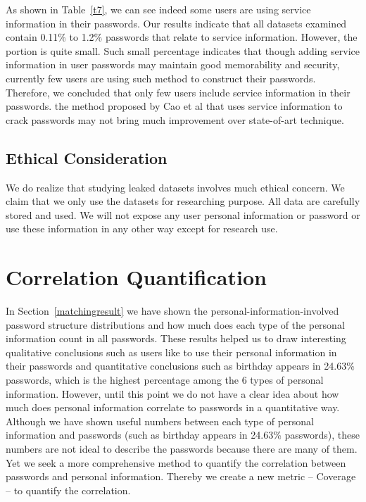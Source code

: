 \documentclass{sig-alternate}
\begin{document}
As shown in Table~\ref{t7}, we can see indeed some users are using service information in their passwords. Our results indicate that all datasets examined contain 0.11\% to 1.2\% passwords that relate to service information. However, the portion is quite small. Such small percentage indicates that though adding service information in user passwords may maintain good memorability and security, currently few users are using such method to construct their passwords. Therefore, we concluded that only few users include service information in their passwords. the method proposed by Cao et al that uses service information to crack passwords may not bring much improvement over state-of-art technique.


\subsection{Ethical Consideration}
We do realize that studying leaked datasets involves much ethical concern. We claim that we only use the datasets for researching purpose. All data are carefully stored and used. We will not expose any user personal information or password or use these information in any other way except for research use.

\section{Correlation Quantification}
\label{correlationquantification}
In Section~\ref{matchingresult} we have shown the personal-information-involved password structure distributions and how much does each type of the personal information count in all passwords. These results helped us to draw interesting qualitative conclusions such as users like to use their personal information in their passwords and quantitative conclusions such as birthday appears in 24.63\% passwords, which is the highest percentage among the 6 types of personal information.
However, until this point we do not have a clear idea about how much does personal information correlate to passwords in a quantitative way. Although we have shown useful numbers between each type of personal information and passwords (such as birthday appears in 24.63\% passwords), these numbers are not ideal to describe the passwords because there are many of them. Yet we seek a more comprehensive method to quantify the correlation between passwords and personal information. Thereby we create a new metric -- Coverage -- to quantify the correlation. 
\end{document}
